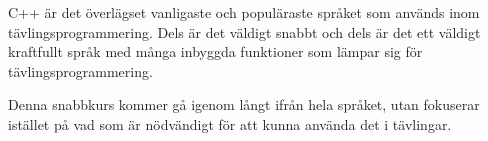 C++ är det överlägset vanligaste och populäraste språket som används inom tävlingsprogrammering. Dels är det väldigt snabbt och dels är det ett väldigt kraftfullt språk med många inbyggda funktioner som lämpar sig för tävlingsprogrammering.

Denna snabbkurs kommer gå igenom långt ifrån hela språket, utan fokuserar istället på vad som är nödvändigt för att kunna använda det i tävlingar.